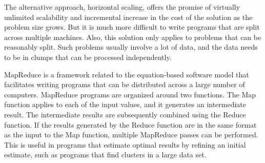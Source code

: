 The alternative approach, horizontal scaling, offers the promise of virtually unlimited
scalability and incremental increase in the cost of the solution as the problem size grows.
But it is much more difficult to write programs that are split across multiple machines.
Also, this solution only applies to problems that can be reasonably split.  Such problems
usually involve a lot of data, and the data needs to be in clumps 
that can be processed independently.

MapReduce is a framework related to the equation-based software model that facilitates writing
programs that can be distributed across a large number of computers.  
MapReduce programs are organized around two functions.  
The Map function applies to each of the input values, and
it generates an intermediate result.  
The intermediate results are subsequently combined using the Reduce function.  
If the results generated by the Reduce function are in the same format
as the input to the Map function, multiple MapReduce passes can be performed.  
This is useful in programs that estimate optimal results by refining an initial estimate, 
such as programs that find clusters in a large data set.

